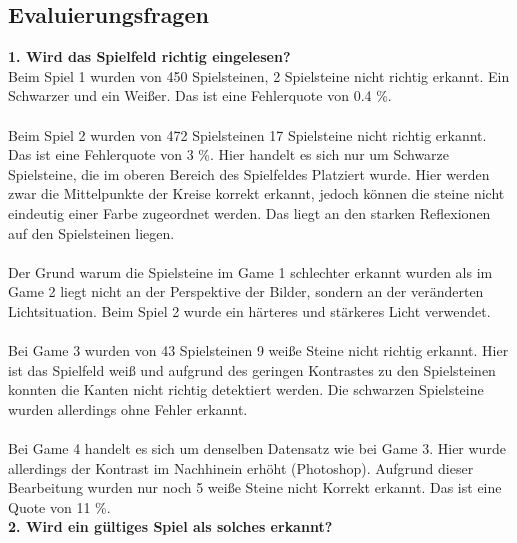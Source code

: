 \documentclass[paper=A4, deutsch]{scrartcl}
\begin{document}
\subsection{Evaluierungsfragen}

\textbf{1. Wird das Spielfeld richtig eingelesen?} \\
Beim Spiel 1 wurden von 450 Spielsteinen, 2 Spielsteine nicht richtig erkannt. Ein Schwarzer und ein Weißer. Das ist eine Fehlerquote von 0.4 \%. \\
\\
Beim Spiel 2 wurden von 472 Spielsteinen 17 Spielsteine nicht richtig erkannt. Das ist eine Fehlerquote von 3 \%. Hier handelt es sich nur um Schwarze Spielsteine, die im oberen Bereich des Spielfeldes Platziert wurde. Hier werden zwar die Mittelpunkte der Kreise korrekt erkannt, jedoch können die steine nicht eindeutig einer Farbe zugeordnet werden. Das liegt an den starken Reflexionen auf den Spielsteinen liegen. \\ 
\\
Der Grund warum die Spielsteine im Game 1 schlechter erkannt wurden als im Game 2 liegt nicht an der Perspektive der Bilder, sondern an der veränderten Lichtsituation. Beim Spiel 2 wurde ein härteres und stärkeres Licht verwendet. \\
\\
Bei Game 3 wurden von 43 Spielsteinen 9 weiße Steine nicht richtig erkannt. Hier ist das Spielfeld weiß und aufgrund des geringen Kontrastes zu den Spielsteinen konnten die Kanten nicht richtig detektiert werden. Die schwarzen Spielsteine wurden allerdings ohne Fehler erkannt. \\
\\
Bei Game 4 handelt es sich um denselben Datensatz wie bei Game 3. Hier wurde allerdings der Kontrast im Nachhinein erhöht (Photoshop). Aufgrund dieser Bearbeitung wurden nur noch 5 weiße Steine nicht Korrekt erkannt. Das ist eine Quote von 11 \%.
\\



\textbf{2. Wird ein gültiges Spiel als solches erkannt?}
\\
\end{document}
